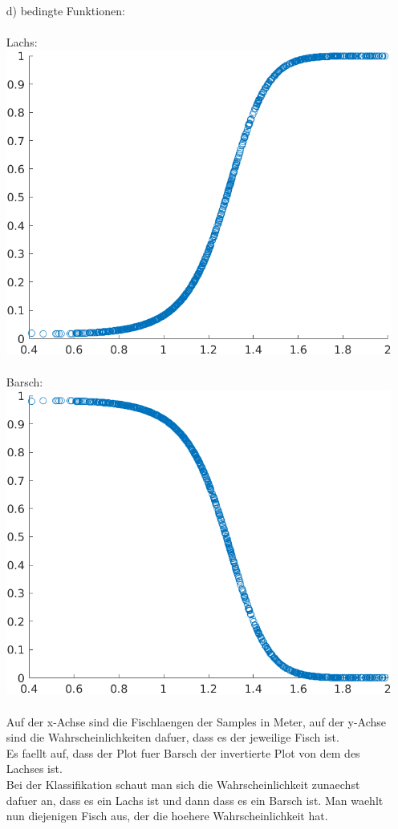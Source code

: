 \documentclass[a4paper]{scrartcl}
\begin{document}
\begin{itemize}
	\item[d)] bedingte Funktionen:\\\\
	Lachs:\\
	\includegraphics*[scale=0.5]{assignment2_data/plots/cond_function_salmon.png}\\ \ \\
	Barsch:\\
	\includegraphics*[scale=0.5]{assignment2_data/plots/cond_function_seabass.png}\\ \ \\
	Auf der x-Achse sind die Fischlaengen der Samples in Meter, auf der y-Achse sind die Wahrscheinlichkeiten dafuer, dass es der jeweilige Fisch ist.\\
	Es faellt auf, dass der Plot fuer Barsch der invertierte Plot von dem des Lachses ist.\\
	Bei der Klassifikation schaut man sich die Wahrscheinlichkeit zunaechst dafuer an, dass es ein Lachs ist und dann dass es ein Barsch ist. Man waehlt nun diejenigen Fisch aus, der die hoehere Wahrscheinlichkeit hat.\\ 
	

\end{itemize}
\end{document}
